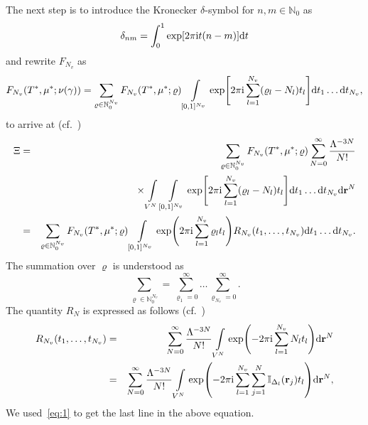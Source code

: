 \documentclass[12pt]{article}
\numberwithin{equation}{section}
\begin{document}
	The next step is to introduce the Kronecker $\delta$-symbol for $n, m \in \mathbb{N}_0$ as
	\begin{equation}
		\delta_{nm} = \int_0^1 \exp[2\pi {\rm i} t (n-m)] {\rm d}t
	\end{equation}
	and rewrite $F_{N_v}$ as
	\begin{equation}
		F_{N_v}(T^*,\mu^*;\nu(\gamma)) = \sum_{\varrho \in \mathbb{N}_0^{N_v}} F_{N_v}(T^*, \mu^*;\varrho) 
		\int\limits_{[0,1]^{N_v}} \exp[2\pi{\rm i} \sum_{l=1}^{N_v} (\varrho_l - N_l)t_l ] {\rm d} t_1 \ldots {\rm d} t_{N_v},
	\end{equation}
	to arrive at (cf.~\cite[(2.9)]{KKD20})
	\begin{eqnarray}
		\label{eq:XiR}
		\Xi & = &  \sum_{\varrho \in \mathbb{N}_0^{N_v}} F_{N_v}(T^*, \mu^*; \varrho) 
		\sum_{N=0}^{\infty} \frac{\Lambda^{-3N}}{N!} 
		\nonumber\\
		&& \times \int\limits_{V^N} \int\limits_{[0,1]^{N_v}} 
		\exp[2\pi{\rm i} \sum_{l=1}^{N_v} (\varrho_l - N_l)t_l ] {\rm d} t_1 \ldots {\rm d} t_{N_v} {\rm d} \vb{r}^N 
		\nonumber\\
		& = & \sum_{\varrho \in \mathbb{N}_0^{N_v}} F_{N_v}(T^*, \mu^*; \varrho)
		\int\limits_{[0,1]^{N_v}} \exp(2\pi{\rm i} \sum_{l=1}^{N_v} \varrho_l t_l) R_{N_v}(t_1, \ldots, t_{N_v}) {\rm d} t_1 \ldots {\rm d} t_{N_v}.
	\end{eqnarray}
	The summation over $\varrho$ is understood as
	\begin{equation}
		\sum_{\varrho \in \mathbb{N}_0^{N_v}} = \sum_{\varrho_1=0}^{\infty} \ldots \sum_{\varrho_{N_v}=0}^{\infty}.
	\end{equation}
	The quantity $R_N$ is expressed as follows (cf.~\cite[(2.10)]{KKD20})
	\begin{eqnarray}
		\label{def:RN}
		R_{N_v}(t_1, \ldots, t_{N_v}) & = & \sum_{N=0}^{\infty} \frac{\Lambda^{-3N}}{N!} \int\limits_{V^N} \exp(-2\pi{\rm i} \sum_{l=1}^{N_v} N_l t_l) {\rm d} \vb{r}^N
		\nonumber\\
		&=& \sum_{N=0}^{\infty} \frac{\Lambda^{-3N}}{N!} \int\limits_{V^N} \exp(-2\pi{\rm i} \sum_{l=1}^{N_v} \sum_{j=1}^{N} \mathbb{I}_{\Delta_{l}}(\vb{r}_j) t_l) {\rm d} \vb{r}^N,
	\end{eqnarray}
	We used~\eqref{eq:1} to get the last line in the above equation.
	
\end{document}
